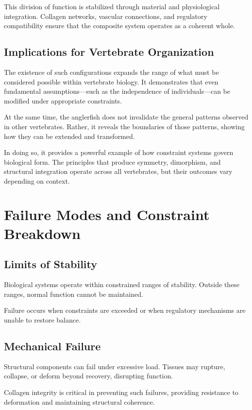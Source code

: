\documentclass[11pt,oneside]{book}
\begin{document}
This division of function is stabilized through material and physiological integration. Collagen networks, vascular connections, and regulatory compatibility ensure that the composite system operates as a coherent whole.

\section{Implications for Vertebrate Organization}

The existence of such configurations expands the range of what must be considered possible within vertebrate biology. It demonstrates that even fundamental assumptions—such as the independence of individuals—can be modified under appropriate constraints.

At the same time, the anglerfish does not invalidate the general patterns observed in other vertebrates. Rather, it reveals the boundaries of those patterns, showing how they can be extended and transformed.

In doing so, it provides a powerful example of how constraint systems govern biological form. The principles that produce symmetry, dimorphism, and structural integration operate across all vertebrates, but their outcomes vary depending on context.

\chapter{Failure Modes and Constraint Breakdown}

\section{Limits of Stability}

Biological systems operate within constrained ranges of stability. Outside these ranges, normal function cannot be maintained.

Failure occurs when constraints are exceeded or when regulatory mechanisms are unable to restore balance.

\section{Mechanical Failure}

Structural components can fail under excessive load. Tissues may rupture, collapse, or deform beyond recovery, disrupting function.

Collagen integrity is critical in preventing such failures, providing resistance to deformation and maintaining structural coherence.
\end{document}
